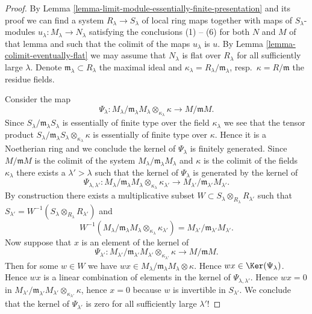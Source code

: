 \begin{proof}
By
Lemma \ref{lemma-limit-module-essentially-finite-presentation}
and its proof we can find a system $R_\lambda \to S_\lambda$ of
local ring maps together with maps of $S_\lambda$-modules
$u_\lambda : M_\lambda \to N_\lambda$ satisfying the conclusions
(1) -- (6) for both $N$ and $M$ of that lemma and such that the
colimit of the maps $u_\lambda$ is $u$. By
Lemma \ref{lemma-colimit-eventually-flat}
we may assume that $N_\lambda$ is flat over $R_\lambda$ for all
sufficiently large $\lambda$. Denote $\mathfrak m_\lambda \subset R_\lambda$
the maximal ideal and $\kappa_\lambda = R_\lambda / \mathfrak m_\lambda$,
resp.\ $\kappa = R/\mathfrak m$ the residue fields.

\medskip\noindent
Consider the map
$$
\Psi_\lambda :
M_\lambda/\mathfrak m_\lambda M_\lambda \otimes_{\kappa_\lambda} \kappa
\longrightarrow
M/\mathfrak m M.
$$
Since $S_\lambda/\mathfrak m_\lambda S_\lambda$ is essentially of finite type
over the field $\kappa_\lambda$ we see that the tensor product
$S_\lambda/\mathfrak m_\lambda S_\lambda \otimes_{\kappa_\lambda} \kappa$
is essentially of finite type over $\kappa$. Hence it is a Noetherian
ring and we conclude the kernel of $\Psi_\lambda$ is finitely generated.
Since $M/\mathfrak m M$ is the colimit of the system
$M_\lambda/\mathfrak m_\lambda M_\lambda$ and $\kappa$ is the colimit of
the fields $\kappa_\lambda$ there exists a $\lambda' > \lambda$ such that
the kernel of $\Psi_\lambda$ is generated by the kernel of
$$
\Psi_{\lambda, \lambda'} :
M_\lambda/\mathfrak m_\lambda M_\lambda
\otimes_{\kappa_\lambda}
\kappa_{\lambda'}
\longrightarrow
M_{\lambda'}/\mathfrak m_{\lambda'} M_{\lambda'}.
$$
By construction there exists a multiplicative subset
$W \subset S_\lambda \otimes_{R_\lambda} R_{\lambda'}$ such that
$S_{\lambda'} = W^{-1}(S_\lambda \otimes_{R_\lambda} R_{\lambda'})$ and
$$
W^{-1}(M_\lambda/\mathfrak m_\lambda M_\lambda
\otimes_{\kappa_\lambda}
\kappa_{\lambda'})
=
M_{\lambda'}/\mathfrak m_{\lambda'} M_{\lambda'}.
$$
Now suppose that $x$ is an element of the kernel of
$$
\Psi_{\lambda'} :
M_{\lambda'}/\mathfrak m_{\lambda'} M_{\lambda'}
\otimes_{\kappa_{\lambda'}} \kappa
\longrightarrow
M/\mathfrak m M.
$$
Then for some $w \in W$ we have
$wx \in M_\lambda/\mathfrak m_\lambda M_\lambda \otimes \kappa$.
Hence $wx \in \Ker(\Psi_\lambda)$. Hence $wx$ is a linear
combination of elements in the kernel of $\Psi_{\lambda, \lambda'}$.
Hence $wx = 0$ in $M_{\lambda'}/\mathfrak m_{\lambda'} M_{\lambda'}
\otimes_{\kappa_{\lambda'}} \kappa$, hence $x = 0$ because $w$ is invertible
in $S_{\lambda'}$.
We conclude that the kernel of $\Psi_{\lambda'}$ is zero for all sufficiently
large $\lambda'$!


\end{proof}
